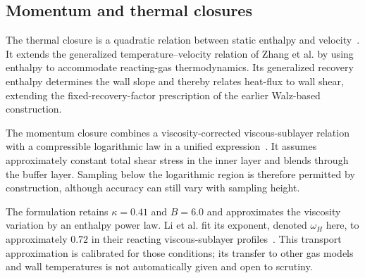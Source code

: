 \subsection{Momentum and thermal closures}
\label{subsec:wall-functions:gao-li:governing-relations}

The thermal closure is a quadratic relation between static enthalpy and velocity~\cite[Eqs.~(12)--(15)]{li2025WF}. It extends the generalized temperature--velocity relation of Zhang et al. by using enthalpy to accommodate reacting-gas thermodynamics. Its generalized recovery enthalpy determines the wall slope and thereby relates heat-flux to wall shear, extending the fixed-recovery-factor prescription of the earlier Walz-based construction.
\par\medskip

The momentum closure combines a viscosity-corrected viscous-sublayer relation with a compressible logarithmic law in a unified expression~\cite[Eqs.~(27), (30)--(32)]{li2025WF}. It assumes approximately constant total shear stress in the inner layer and blends through the buffer layer. Sampling below the logarithmic region is therefore permitted by construction, although accuracy can still vary with sampling height.
\par\medskip

\label{subsec:wall-functions:gao-li:empirical-constants}
The formulation retains \(\kappa=0.41\) and \(B=6.0\) and approximates the viscosity variation by an enthalpy power law. Li et al. fit its exponent, denoted \(\omega_H\) here, to approximately \(0.72\) in their reacting viscous-sublayer profiles~\cite[Eq.~(25) and Figure~12]{li2025WF}. This transport approximation is calibrated for those conditions; its transfer to other gas models and wall temperatures is not automatically given and open to scrutiny.
